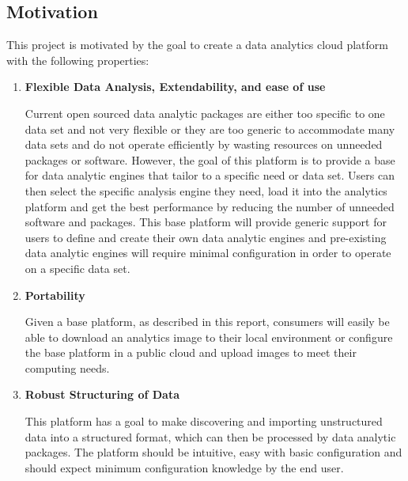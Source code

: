 \subsection{Motivation}
\label{sec:motivation}

This project is motivated by the goal to create a data analytics cloud
platform with the following properties:
\begin{enumerate}
  \item \textbf{Flexible Data Analysis, Extendability, and ease of use}

Current open sourced data analytic packages are either too specific to
one data set and not very flexible or they are too generic to
accommodate many data sets and do not operate efficiently by wasting
resources on unneeded packages or software. However, the goal of this
platform is to provide a base for data analytic engines that tailor to a
specific need or data set. Users can then select the specific analysis
engine they need, load it into the analytics platform and get the best
performance by reducing the number of unneeded software and packages.
This base platform will provide generic support for users to define and
create their own data analytic engines and pre-existing data analytic
engines will require minimal configuration in order to operate on a
specific data set.

  \item \textbf{Portability}

Given a base platform, as described in this report, consumers will easily
be able to download an analytics image to their local environment or
configure the base platform in a public cloud and upload images to meet
their computing needs.

  \item \textbf{Robust Structuring of Data} 

This platform has a goal to make discovering and importing unstructured
data into a structured format, which can then be processed by data
analytic packages. The platform should be intuitive, easy with basic configuration and
should expect minimum configuration knowledge by the end user.

\end{enumerate}
